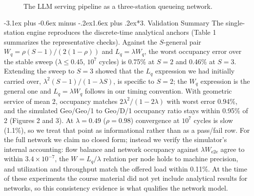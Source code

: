 \documentclass[11pt,a4paper]{article}
\makeatletter
\renewcommand\section{\@startsection{section}{1}{\z@}%
  {-3.1ex plus -0.6ex minus -.2ex}{1.6ex plus .2ex}{\normalfont\Large\bfseries}}
\makeatother
\begin{document}
\begin{figure}[H]
\centering
{}
\caption{The LLM serving pipeline as a three-station queueing network.}
\end{figure}

\section*{3. Validation Summary}
The single-station engine reproduces the discrete-time analytical anchors
(Table 1 summarizes the representative checks).
Against the $S$-general pair $W_q = \rho(S-1)/(2(1-\rho))$ and
$L_q = \lambda W_q$, the worst occupancy error over the stable sweep
($\lambda \le 0.45$, $10^7$ cycles) is 0.75\% at $S=2$ and 0.46\% at $S=3$.
Extending the sweep to $S=3$ showed that the $L_q$ expression we had
initially carried over, $\lambda^2(S-1)/(1-\lambda S)$, is specific to
$S=2$; the $W_q$ expression is the general one and $L_q = \lambda W_q$
follows in our timing convention. With geometric service of mean 2, occupancy
matches $2\lambda^2/(1-2\lambda)$ with worst error 0.94\%, and the simulated
Geo/Geo/1 to Geo/D/1 occupancy ratio stays within 0.95\% of 2 (Figures 2 and
3). At $\lambda = 0.49$ ($\rho = 0.98$) convergence at $10^7$ cycles is slow
(1.1\%), so we treat that point as informational rather than as a pass/fail
row. For the full network we claim no closed form; instead we verify the
simulator's internal accounting: flow balance and network occupancy against
$\lambda W_{\text{e2e}}$ agree to within $3.4\times10^{-7}$, the
$W = L_q/\lambda$ relation per node holds to machine precision, and
utilization and throughput match the offered load within 0.11\%. At the time
of these experiments the course material did not yet include analytical
results for networks, so this consistency evidence is what qualifies the
network model.
\end{document}
